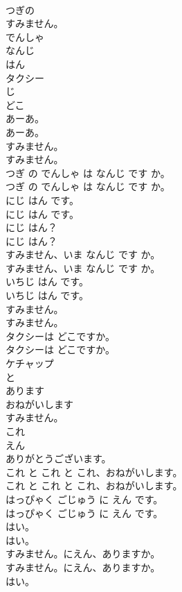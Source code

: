 \documentclass[8pt]{extreport}
\begin{document}
\begin{CJK}{UTF8}{min}
\\	つぎの
\\	すみません。
\\	でんしゃ
\\	なんじ
\\	はん
\\	タクシー
\\	じ
\\	どこ
\\	あーあ。	
\\	あーあ。 
\\	すみません。	
\\	すみません。 
\\	つぎ の でんしゃ は なんじ です か。	
\\	つぎ の でんしゃ は なんじ です か。 
\\	にじ はん です。	
\\	にじ はん です。 
\\	にじ はん？	
\\	にじ はん？ 
\\	すみません、いま なんじ です か。	
\\	すみません、いま なんじ です か。 
\\	いちじ はん です。	
\\	いちじ はん です。 
\\	すみません。	
\\	すみません。 
\\	タクシーは どこですか。	
\\	タクシーは どこですか。 
\\	ケチャップ
\\	と
\\	あります
\\	おねがいします
\\	すみません。
\\	これ
\\	えん
\\	ありがとうございます。
\\	これ と これ と これ、おねがいします。	
\\	これ と これ と これ、おねがいします。 
\\	はっぴゃく ごじゅう に えん です。	
\\	はっぴゃく ごじゅう に えん です。 
\\	はい。	
\\	はい。 
\\	すみません。にえん、ありますか。	
\\	すみません。にえん、ありますか。 
\\	はい。	

\end{CJK}
\end{document}
